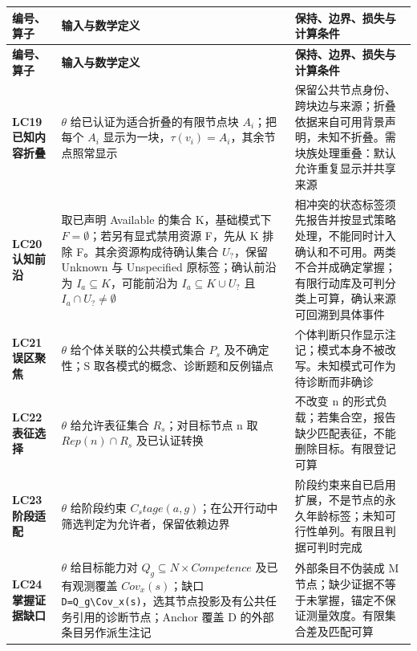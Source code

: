 \documentclass[UTF8,a4paper,zihao=-4,fontset=windows,openany]{ctexbook}
\def\mathrm#1{#1}%
\newcommand{\mcsbrk}{\penalty 200\relax}
\begin{document}
\begingroup\small\setlength{\tabcolsep}{4pt}
\begin{longtable}{>{\raggedright\arraybackslash}p{}>{\raggedright\arraybackslash}p{}>{\raggedright\arraybackslash}p{}}
\toprule
\textbf{编号、算子} & \textbf{输入与数学定义} & \textbf{保持、边界、损失与计算条件} \\
\midrule
\endfirsthead
\toprule
\textbf{编号、算子} & \textbf{输入与数学定义} & \textbf{保持、边界、损失与计算条件} \\
\midrule
\endhead
\bottomrule
\endfoot
\bottomrule
\endlastfoot
\textbf{LC19 已知内容折叠} & \(\theta\) 给已认证为适合折叠的有限节点块 \(A_i\)；把每个 \(A_i\) 显示为一块，\(\tau(v_i)=A_i\)，其余节点照常显示 & 保留公共节点身份、跨块边与来源；折叠依据来自可用背景声明，未知不折叠。需块族处理重叠：默认允许重复显示并共享来源 \\
\textbf{LC20 认知前沿} & 取已声明 Available 的集合 K，基础模式下 \(F=\emptyset\)；若另有显式禁用资源 F，先从 K 排除 F。其余资源构成待确认集合 \(U_?\)，保留 Unknown 与 Unspecified 原标签；确认前沿为 \(I_a\subseteq K\)，可能前沿为 \(I_a\subseteq K\cup U_?\) 且 \(I_a\cap U_?\ne\emptyset\) & 相冲突的状态标签须先报告并按显式策略处理，不能同时计入确认和不可用。两类不合并成确定掌握；有限行动库及可判分类上可算，确认来源可回溯到具体事件 \\
\textbf{LC21 误区聚焦} & \(\theta\) 给个体关联的公共模式集合 \(P_s\) 及不确定性；S 取各模式的概念、诊断题和反例锚点 & 个体判断只作显示注记；模式本身不被改写。未知模式可作为待诊断而非确诊 \\
\textbf{LC22 表征选择} & \(\theta\) 给允许表征集合 \(R_s\)；对目标节点 n 取 \(\mathrm{Rep}(n)\cap R_s\) 及已认证转换 & 不改变 n 的形式负载；若集合空，报告缺少匹配表征，不能删除目标。有限登记可算 \\
\textbf{LC23 阶段适配} & \(\theta\) 给阶段约束 \(C_\mathrm{stage}(a,g)\)；在公开行动中筛选判定为允许者，保留依赖边界 & 阶段约束来自已启用扩展，不是节点的永久年龄标签；未知可行性单列。有限且判据可判时完成 \\
\textbf{LC24 掌握证据缺口} & \(\theta\) 给目标能力对 \(Q_g\subseteq N\times\mathrm{Competence}\) 及已有观测覆盖 \(\mathrm{Cov}_x(s)\)；缺口 \texttt{D=Q\mcsbrk\_g\textbackslash{}Cov\mcsbrk\_x(s)}，选其节点投影及有公共任务引用的诊断节点；Anchor 覆盖 D 的外部条目另作派生注记 & 外部条目不伪装成 M 节点；缺少证据不等于未掌握，锚定不保证测量效度。有限集合差及匹配可算 \\
\end{longtable}
\endgroup
\end{document}
